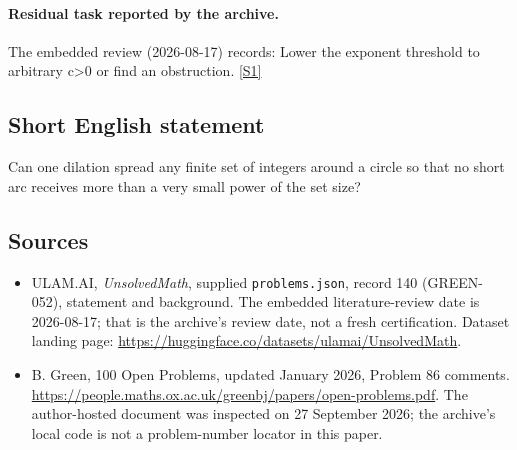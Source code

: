 \documentclass[11pt,a4paper]{article}
\newcommand{\sref}[2]{\hyperlink{source:#1:#2}{[S#2]}}
\begin{document}
\paragraph{Residual task reported by the archive.}

The embedded review (2026-08-17) records: Lower the exponent threshold to arbitrary c>0 or find an obstruction. \sref{140}{1}

\subsection{Short English statement}

Can one dilation spread any finite set of integers around a circle so that no short arc receives more than a very small power of the set size?

\subsection{Sources}

{\small

\begin{itemize}

\item[\hypertarget{source:140:1}{S1}] ULAM.AI, \emph{UnsolvedMath}, supplied \texttt{problems.json}, record 140 (GREEN-052), statement and background. The embedded literature-review date is 2026-08-17; that is the archive’s review date, not a fresh certification. Dataset landing page: \url{https://huggingface.co/datasets/ulamai/UnsolvedMath}.

\item[\hypertarget{source:140:2}{S2}] B. Green, 100 Open Problems, updated January 2026, Problem 86 comments. \url{https://people.maths.ox.ac.uk/greenbj/papers/open-problems.pdf}. The author-hosted document was inspected on 27 September 2026; the archive’s local code is not a problem-number locator in this paper.

\end{itemize}

}

\label{end:140}
\end{document}
